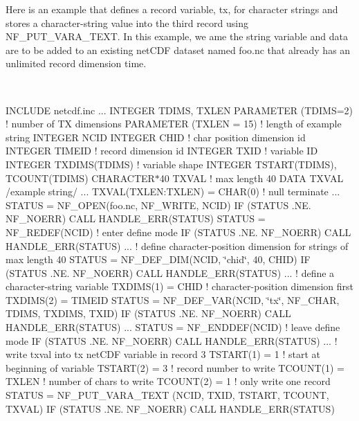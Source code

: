 Here is an example that defines a record variable, tx, for character strings and stores a character-\/string value into the third record using N\+F\+\_\+\+P\+U\+T\+\_\+\+V\+A\+R\+A\+\_\+\+T\+E\+XT. In this example, we ame the string variable and data are to be added to an existing net\+C\+DF dataset named foo.\+nc that already has an unlimited record dimension time.

 

I\+N\+C\+L\+U\+DE \textquotesingle{}netcdf.\+inc\textquotesingle{} ... I\+N\+T\+E\+G\+ER T\+D\+I\+MS, T\+X\+L\+EN P\+A\+R\+A\+M\+E\+T\+ER (T\+D\+I\+MS=2) ! number of TX dimensions P\+A\+R\+A\+M\+E\+T\+ER (T\+X\+L\+EN = 15) ! length of example string I\+N\+T\+E\+G\+ER N\+C\+ID I\+N\+T\+E\+G\+ER C\+H\+ID ! char position dimension id I\+N\+T\+E\+G\+ER T\+I\+M\+E\+ID ! record dimension id I\+N\+T\+E\+G\+ER T\+X\+ID ! variable ID I\+N\+T\+E\+G\+ER T\+X\+D\+I\+M\+S(\+T\+D\+I\+M\+S) ! variable shape I\+N\+T\+E\+G\+ER T\+S\+T\+A\+R\+T(\+T\+D\+I\+M\+S), T\+C\+O\+U\+N\+T(\+T\+D\+I\+M\+S) C\+H\+A\+R\+A\+C\+T\+E\+R$\ast$40 T\+X\+V\+AL ! max length 40 D\+A\+TA T\+X\+V\+AL /\textquotesingle{}example string\textquotesingle{}/ ... T\+X\+V\+A\+L(\+T\+X\+L\+E\+N\+:\+T\+X\+L\+E\+N) = C\+H\+A\+R(0) ! null terminate ... S\+T\+A\+T\+US = N\+F\+\_\+\+O\+P\+EN(\textquotesingle{}foo.\+nc\textquotesingle{}, N\+F\+\_\+\+W\+R\+I\+TE, N\+C\+ID) IF (S\+T\+A\+T\+US .NE. N\+F\+\_\+\+N\+O\+E\+RR) C\+A\+LL H\+A\+N\+D\+L\+E\+\_\+\+E\+R\+R(\+S\+T\+A\+T\+U\+S) S\+T\+A\+T\+US = N\+F\+\_\+\+R\+E\+D\+E\+F(\+N\+C\+I\+D) ! enter define mode IF (S\+T\+A\+T\+US .NE. N\+F\+\_\+\+N\+O\+E\+RR) C\+A\+LL H\+A\+N\+D\+L\+E\+\_\+\+E\+R\+R(\+S\+T\+A\+T\+U\+S) ... ! define character-\/position dimension for strings of max length 40 S\+T\+A\+T\+US = N\+F\+\_\+\+D\+E\+F\+\_\+\+D\+IM(N\+C\+ID, \char`\"{}chid\char`\"{}, 40, C\+H\+ID) IF (S\+T\+A\+T\+US .NE. N\+F\+\_\+\+N\+O\+E\+RR) C\+A\+LL H\+A\+N\+D\+L\+E\+\_\+\+E\+R\+R(\+S\+T\+A\+T\+U\+S) ... ! define a character-\/string variable T\+X\+D\+I\+M\+S(1) = C\+H\+ID ! character-\/position dimension first T\+X\+D\+I\+M\+S(2) = T\+I\+M\+E\+ID S\+T\+A\+T\+US = N\+F\+\_\+\+D\+E\+F\+\_\+\+V\+AR(N\+C\+ID, \char`\"{}tx\char`\"{}, N\+F\+\_\+\+C\+H\+AR, T\+D\+I\+MS, T\+X\+D\+I\+MS, T\+X\+ID) IF (S\+T\+A\+T\+US .NE. N\+F\+\_\+\+N\+O\+E\+RR) C\+A\+LL H\+A\+N\+D\+L\+E\+\_\+\+E\+R\+R(\+S\+T\+A\+T\+U\+S) ... S\+T\+A\+T\+US = N\+F\+\_\+\+E\+N\+D\+D\+E\+F(\+N\+C\+I\+D) ! leave define mode IF (S\+T\+A\+T\+US .NE. N\+F\+\_\+\+N\+O\+E\+RR) C\+A\+LL H\+A\+N\+D\+L\+E\+\_\+\+E\+R\+R(\+S\+T\+A\+T\+U\+S) ... ! write txval into tx net\+C\+DF variable in record 3 T\+S\+T\+A\+R\+T(1) = 1 ! start at beginning of variable T\+S\+T\+A\+R\+T(2) = 3 ! record number to write T\+C\+O\+U\+N\+T(1) = T\+X\+L\+EN ! number of chars to write T\+C\+O\+U\+N\+T(2) = 1 ! only write one record S\+T\+A\+T\+US = N\+F\+\_\+\+P\+U\+T\+\_\+\+V\+A\+R\+A\+\_\+\+T\+E\+XT (N\+C\+ID, T\+X\+ID, T\+S\+T\+A\+RT, T\+C\+O\+U\+NT, T\+X\+V\+AL) IF (S\+T\+A\+T\+US .NE. N\+F\+\_\+\+N\+O\+E\+RR) C\+A\+LL H\+A\+N\+D\+L\+E\+\_\+\+E\+R\+R(\+S\+T\+A\+T\+U\+S)

